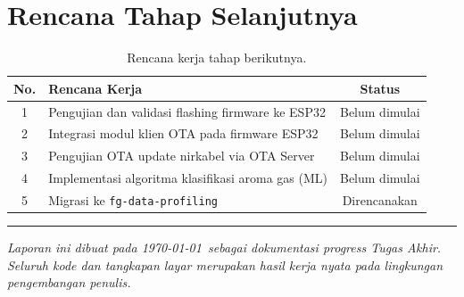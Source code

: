 \documentclass[12pt,a4paper]{report}
\begin{document}
\section{Rencana Tahap Selanjutnya}

\begin{table}[H]
  \centering
  \caption{Rencana kerja tahap berikutnya.}
  \label{tab:rencana}
  \begin{tabular}{clc}
    \toprule
    \textbf{No.} & \textbf{Rencana Kerja} & \textbf{Status} \\
    \midrule
    1 & Pengujian dan validasi flashing firmware ke ESP32 & Belum dimulai \\
    2 & Integrasi modul klien OTA pada firmware ESP32     & Belum dimulai \\
    3 & Pengujian OTA update nirkabel via OTA Server      & Belum dimulai \\
    4 & Implementasi algoritma klasifikasi aroma gas (ML) & Belum dimulai \\
    5 & Migrasi ke \texttt{fg-data-profiling}             & Direncanakan \\
    \bottomrule
  \end{tabular}
\end{table}

\vspace{1cm}
\hrule
\vspace{0.5cm}
{\small\textit{Laporan ini dibuat pada \today\ sebagai dokumentasi progress
Tugas Akhir. Seluruh kode dan tangkapan layar merupakan hasil kerja nyata
pada lingkungan pengembangan penulis.}}
\end{document}

